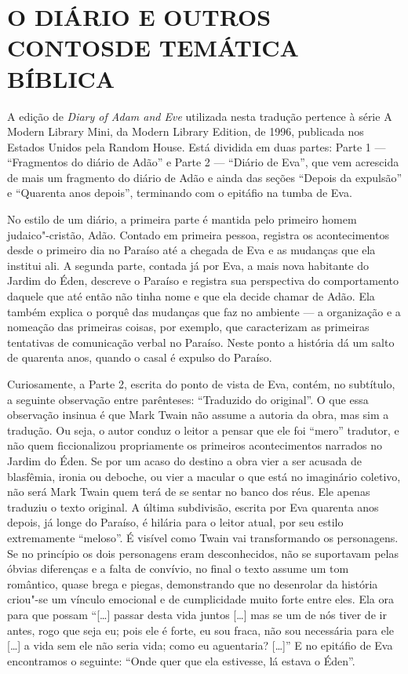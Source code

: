 \section{O DIÁRIO E OUTROS CONTOS\break DE TEMÁTICA BÍBLICA}

A edição de \textit{Diary of Adam and Eve} utilizada nesta tradução pertence à série
A Modern Library Mini, da Modern Library Edition, de 1996, publicada nos
Estados Unidos pela Random House. Está dividida em duas partes: Parte 1 ---
``Fragmentos do diário de Adão'' e Parte 2 --- 
``Diário de Eva'', que vem acrescida de mais
um fragmento do diário de Adão e ainda das seções
``Depois da expulsão'' e ``Quarenta
anos depois'', terminando com o epitáfio na tumba de Eva.

No estilo de um diário, a primeira parte é mantida pelo primeiro
homem judaico"-cristão, Adão. Contado em primeira pessoa, registra os
acontecimentos desde o primeiro dia no Paraíso até a chegada de Eva e as
mudanças que ela institui ali. A segunda parte, contada já por
Eva, a mais nova habitante do Jardim do Éden, descreve o Paraíso e
registra sua perspectiva do comportamento daquele que até então não
tinha nome e que ela decide chamar de Adão. Ela também explica o porquê
das mudanças que faz no ambiente --- a organização e a nomeação das
primeiras coisas, por exemplo, que caracterizam as primeiras tentativas
de comunicação verbal no Paraíso. Neste ponto a história dá um salto de
quarenta anos, quando o casal é expulso do Paraíso. 

Curiosamente, a Parte 2, escrita do ponto de vista de Eva, contém, no
subtítulo, a seguinte observação entre parênteses: “Traduzido do
original”. O que essa observação insinua é que Mark Twain não assume a
autoria da obra, mas sim a tradução. Ou seja, o autor conduz o leitor a
pensar que ele foi “mero” tradutor, e não quem ficcionalizou
propriamente os primeiros acontecimentos narrados no Jardim do Éden.
Se por um acaso do destino a obra vier a ser acusada de blasfêmia, ironia ou
deboche, ou vier a macular o que está no imaginário coletivo, não será Mark
Twain quem terá de se sentar no banco dos réus. Ele apenas traduziu o
texto original. A última subdivisão, escrita por Eva quarenta anos
depois, já longe do Paraíso, é hilária para o leitor atual, por seu estilo
extremamente “meloso”. É visível como Twain vai transformando os
personagens. Se no princípio os dois personagens eram desconhecidos, não
se suportavam pelas óbvias diferenças e a falta de convívio, no final o
texto assume um tom romântico, quase brega e piegas, demonstrando que no
desenrolar da história criou"-se um vínculo emocional e de
cumplicidade muito forte entre eles. Ela ora para que possam “[\ldots{}] passar desta vida juntos 
[\ldots{}] mas se um de nós tiver de ir antes, rogo que seja eu; pois ele
é forte, eu sou fraca, não sou necessária para ele [\ldots{}] a vida sem ele
não seria vida; como eu aguentaria? [\ldots{}]” E no epitáfio de Eva
encontramos o seguinte: “Onde quer que ela estivesse, lá estava o     
Éden”.

